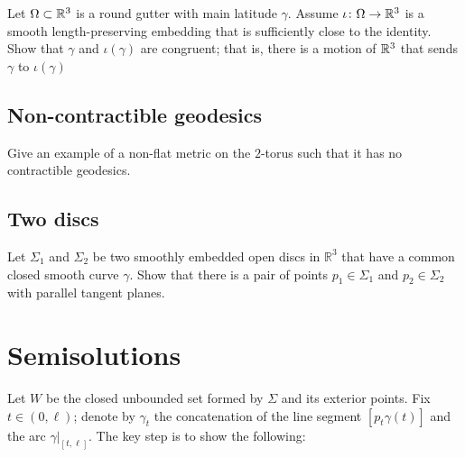 \begin{pr}
Let $\Omega\subset \mathbb{R}^3$ is a round gutter with main latitude $\gamma$. 
Assume $\iota\:\Omega\z\to\RR^3$ 
is a smooth length-preserving embedding that is sufficiently close to the identity.
Show that $\gamma$ and $\iota(\gamma)$ are congruent;
that is, there is a motion of $\mathbb{R}^3$ that sends $\gamma$ to $\iota(\gamma)$
\end{pr}



\subsection*{Non-contractible geodesics}
\label{torus}

\begin{pr}
Give an example of a non-flat metric 
on the $2$-torus such that it has no contractible geodesics.
\end{pr}


\subsection*{Two discs}
\label{Two discs}

\begin{pr}
Let $\Sigma_1$ and $\Sigma_2$ be two smoothly embedded open discs in $\mathbb R^3$ 
that have a common closed smooth curve $\gamma$.
Show that there is a pair of points  $p_1\in \Sigma_1$ and $p_2\in \Sigma_2$ with parallel tangent planes.
\end{pr}



\section*{Semisolutions}
Let $W$ be the closed unbounded set formed by $\Sigma$ and its exterior points.
Fix $t\in (0,\ell)$;
denote by $\gamma_t$ the concatenation of the line segment $[p_t\gamma(t)]$ and the arc $\gamma|_{[t,\ell]}$.
The key step is to show the following:

